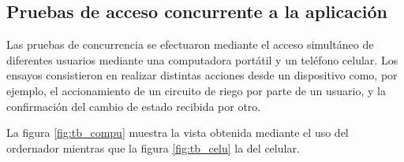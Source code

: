 \subsection{Pruebas de acceso concurrente a la aplicación}
\label{sec:Pruebas de acceso concurrente a la aplicación}



Las pruebas de concurrencia se efectuaron mediante el acceso simultáneo de diferentes usuarios mediante una computadora portátil y un teléfono celular. Los ensayos consistieron en realizar distintas acciones desde un dispositivo como, por ejemplo, el accionamiento de un circuito de riego por parte de un usuario, y la confirmación del cambio de estado recibida por otro. 
 
La figura \ref{fig:tb_compu} muestra la vista obtenida mediante el uso del ordernador mientras que la figura  \ref{fig:tb_celu} la del celular.


